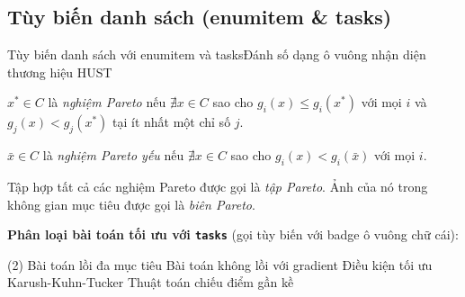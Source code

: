 \documentclass[aspectratio=169,10pt]{beamer}
\begin{document}
\subsection{Tùy biến danh sách (enumitem \& tasks)}
\begin{frame}{Tùy biến danh sách với enumitem và tasks}{Đánh số dạng ô vuông nhận diện thương hiệu HUST}
  \begin{definition}
    \begin{hustsqlist}
      \item $x^* \in C$ là \emph{nghiệm Pareto} nếu $\nexists x \in C$ sao cho $g_i(x) \le g_i(x^*)$ với mọi $i$ và $g_j(x) < g_j(x^*)$ tại ít nhất một chỉ số $j$. \label{def:pareto}
      \item $\bar{x} \in C$ là \emph{nghiệm Pareto yếu} nếu $\nexists x \in C$ sao cho $g_i(x) < g_i(\bar{x})$ với mọi $i$.
      \item Tập hợp tất cả các nghiệm Pareto được gọi là \emph{tập Pareto}. Ảnh của nó trong không gian mục tiêu được gọi là \emph{biên Pareto}.
    \end{hustsqlist}
  \end{definition}
  \vskip 2pt
  \textbf{Phân loại bài toán tối ưu với \texttt{tasks}} (gọi tùy biến với badge ô vuông chữ cái):
  \begin{tasks}[label=\hustitemsq{\alph*}, label-width=18pt, item-indent=22pt, label-format={\bfseries\color{white}}](2)
    \task Bài toán lồi đa mục tiêu
    \task Bài toán không lồi với gradient
    \task Điều kiện tối ưu Karush-Kuhn-Tucker
    \task Thuật toán chiếu điểm gần kề
  \end{tasks}
\end{frame}
\end{document}
